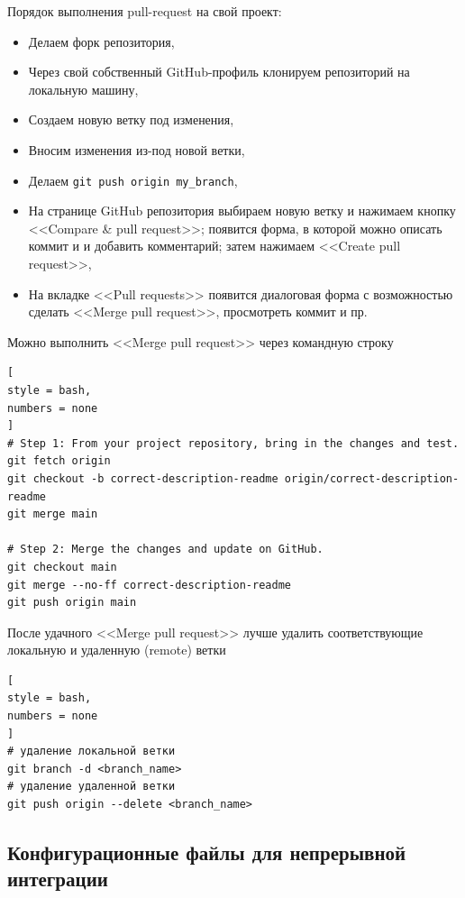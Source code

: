\documentclass[%
	11pt,
	a4paper,
	utf8,
		]{article}
\begin{document}
Порядок выполнения pull-request на свой проект:
\begin{itemize}
	\item Делаем форк репозитория,
	
	\item Через свой собственный GitHub-профиль клонируем репозиторий на локальную машину,
	
	\item Создаем новую ветку под изменения,
	
	\item Вносим изменения из-под новой ветки,
	
	\item Делаем \texttt{git push origin my\_branch},
	
	\item На странице GitHub репозитория выбираем новую ветку и нажимаем кнопку <<Compare \& pull request>>; появится форма, в которой можно описать коммит и и добавить комментарий; затем нажимаем <<Create pull request>>,
	
	\item На вкладке <<Pull requests>> появится диалоговая форма с возможностью сделать <<Merge pull request>>, просмотреть коммит и пр.
\end{itemize}

Можно выполнить <<Merge pull request>> через командную строку
\begin{lstlisting}[
style = bash,
numbers = none
]
# Step 1: From your project repository, bring in the changes and test.
git fetch origin
git checkout -b correct-description-readme origin/correct-description-readme
git merge main

# Step 2: Merge the changes and update on GitHub.
git checkout main
git merge --no-ff correct-description-readme
git push origin main
\end{lstlisting}

После удачного <<Merge pull request>> лучше удалить соответствующие локальную и удаленную (remote) ветки
\begin{lstlisting}[
style = bash,
numbers = none	
]
# удаление локальной ветки
git branch -d <branch_name>
# удаление удаленной ветки
git push origin --delete <branch_name>
\end{lstlisting}



\subsection{Конфигурационные файлы для непрерывной интеграции}
\end{document}
